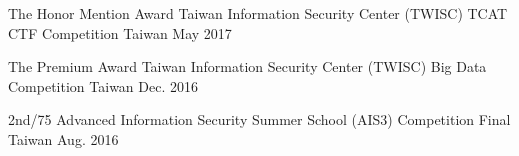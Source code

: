 
\begin{cvhonors}


\cvhonor
{The Honor Mention Award} %
{Taiwan Information Security Center (TWISC) TCAT CTF Competition} %
{Taiwan} %
{May 2017} %


\cvhonor
{The Premium Award} %
{Taiwan Information Security Center (TWISC) Big Data Competition} %
{Taiwan} %
{Dec. 2016} %


\cvhonor
{2nd/75} %
{Advanced Information Security Summer School (AIS3) Competition Final} %
{Taiwan} %
{Aug. 2016} %


\end{cvhonors}